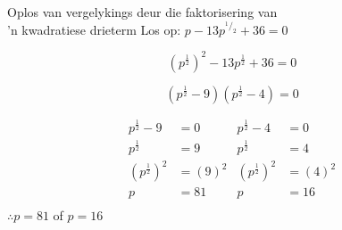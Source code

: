 \begin{wex}
{Oplos van vergelykings deur die faktorisering van \\'n kwadratiese drieterm}
{Los op: $ p-13 p^{^1/_2} + 36 =  0$}
{ %


$$ (p^{\frac{1}{2}})^2 -13p^{\frac{1}{2}} + 36 = 0 $$


$$ (p^{\frac{1}{2}} -9)(p^{\frac{1}{2}}-4) = 0 $$


\begin{align*}
p^{\frac{1}{2}} - 9 &= 0			&   p^{\frac{1}{2}} - 4 &= 0		\\
p^{\frac{1}{2}} &= 9				&   p^{\frac{1}{2}} &= 4		\\		
(p^{\frac{1}{2}})^2 &= (9)^2			&   (p^{\frac{1}{2}})^2 &= (4)^2\\
p &= 81				&   p &= 16\\
\end{align*} 
$\therefore p=81$ of $p=16$
}
\end{wex}
\clearpage
